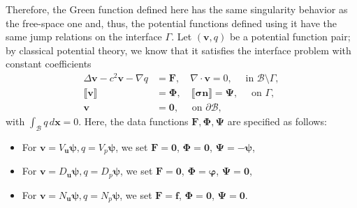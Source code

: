 \documentclass[preprint,11pt]{elsarticle}
\theoremstyle{remark}
\newcommand{\jump}[1]{\llbracket#1\rrbracket}
\newcommand{\grad}[1]{\nabla #1}
\newcommand{\mc}[1]{\mathcal{#1}}
\newcommand{\bm}[1]{\boldsymbol{#1}}
\newcommand{\vph}{\varphi}
\begin{document}
Therefore, the Green function defined here has the same singularity behavior as the free-space one and, thus, the potential functions defined using it have the same jump relations on the interface $\Gamma$. Let $(\bm v, q)$ be a potential function pair; by classical potential theory, we know that it satisfies the interface problem with constant coefficients
\begin{subequations}\label{eqn:equiv-ip}
\begin{align}
    \Delta  \bm v - c^2 \bm v - \grad q &= \bm F, \quad \grad \cdot \bm v = 0,\quad \text{ in }\mathcal{B}\setminus\Gamma, \\
    \jump{\bm v} &= \bm \Phi, \quad  \jump{\bm \sigma \bm n} = \bm \Psi, \quad \text{ on }\Gamma,\\
    \bm v &= \bm 0, \quad \text{ on }\partial\mathcal{B},
\end{align}    
\end{subequations}
with $\int_{\mc B}q\,d\bm x = 0$.
Here, the data functions $\bm F, \bm \Phi, \bm \Psi$ are specified as follows:
\begin{itemize}
    \item For $\bm v = V_{\bm u}\bm\psi, q = V_p \bm\psi$, we set $\bm F = \bm 0$, $\bm \Phi = \bm 0$, $\bm \Psi =-\bm\psi$,
    \item For $\bm v = D_{\bm u}\bm\psi, q = D_p \bm\psi$, we set $\bm F = \bm 0$, $\bm \Phi = \bm \vph$, $\bm \Psi =\bm 0$,
    \item For $\bm v = N_{\bm u}\bm\psi, q = N_p \bm\psi$, we set $\bm F = \bm f$, $\bm \Phi = \bm 0$, $\bm \Psi =\bm 0$.
\end{itemize}
\end{document}
